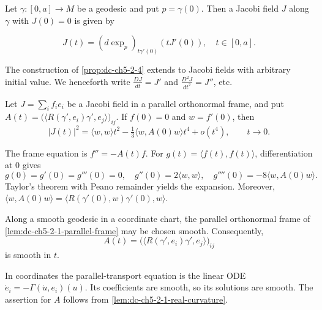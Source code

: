\begin{corollary}
  \label{cor:dc-ch5-2-5}
  \leanok
  Let $\gamma:[0,a]\to M$ be a geodesic and put $p=\gamma(0)$. Then a Jacobi field
  $J$ along $\gamma$ with $J(0)=0$ is given by

  $$
  J(t)=(d\exp_p)_{t\gamma'(0)}(tJ'(0)),\quad t\in[0,a].
  $$

\end{corollary}

\begin{remark}
  \label{rem:dc-ch5-2-6}
  The construction of \cref{prop:dc-ch5-2-4} extends to Jacobi fields with
  arbitrary initial value. We henceforth write $\frac{DJ}{dt}=J'$ and
  $\frac{D^2 J}{dt^2}=J''$, etc.
\end{remark}

\begin{lemma}
  \label{lem:dc-ch5-2-7-taylor-ode}
  \leanok
  Let $J=\sum_i f_i e_i$ be a Jacobi field in a parallel orthonormal frame,
  and put
  $A(t)=\big(\langle R(\gamma',e_i)\gamma',e_j\rangle\big)_{ij}$.
  If $f(0)=0$ and $w=f'(0)$, then
  $$
  |J(t)|^2=\langle w,w\rangle t^2
  -\tfrac13\langle w,A(0)w\rangle t^4+o(t^4),\qquad t\to0.
  $$

  \sketch
  The frame equation is $f''=-A(t)f$. For
  $g(t)=\langle f(t),f(t)\rangle$, differentiation at $0$ gives
  $$
  g(0)=g'(0)=g'''(0)=0,\quad
  g''(0)=2\langle w,w\rangle,\quad
  g''''(0)=-8\langle w,A(0)w\rangle.
  $$
  Taylor's theorem with Peano remainder yields the expansion. Moreover,
  $\langle w,A(0)w\rangle
  =\langle R(\gamma'(0),w)\gamma'(0),w\rangle$.
\end{lemma}

\begin{lemma}
  \label{lem:dc-ch5-2-7-frame-smooth}
  \leanok
  Along a smooth geodesic in a coordinate chart, the parallel orthonormal frame
  of \cref{lem:dc-ch5-2-1-parallel-frame} may be chosen smooth. Consequently,
  $$
  A(t)=\big(\langle R(\gamma',e_i)\gamma',e_j\rangle\big)_{ij}
  $$
  is smooth in $t$.

  \sketch
  In coordinates the parallel-transport equation is the linear ODE
  $\dot e_i=-\Gamma(\dot u,e_i)(u)$. Its coefficients are smooth, so its
  solutions are smooth. The assertion for $A$ follows from
  \cref{lem:dc-ch5-2-1-real-curvature}.
\end{lemma}

